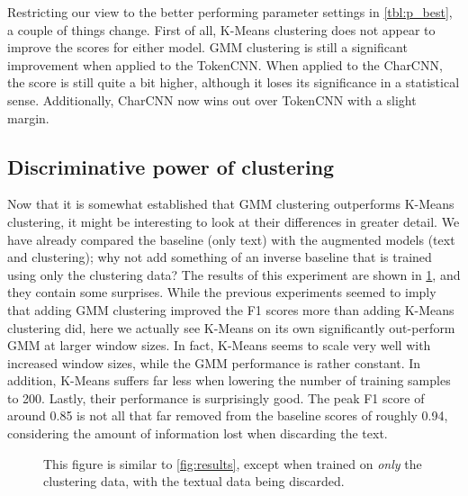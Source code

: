 Restricting our view to the better performing parameter settings in
\cref{tbl:p_best}, a couple of things change. First of all, K-Means clustering
does not appear to improve the scores for either model. GMM clustering is still
a significant improvement when applied to the TokenCNN. When applied to
the CharCNN, the score is still quite a bit higher, although it loses its
significance in a statistical sense. Additionally, CharCNN now wins out over
TokenCNN with a slight margin.

\subsection{Discriminative power of clustering}
Now that it is somewhat established that GMM clustering outperforms K-Means
clustering, it might be interesting to look at their differences in greater
detail. We have already compared the baseline (only text) with the augmented
models (text and clustering); why not add something of an inverse baseline that
is trained using only the clustering data? The results of this experiment are
shown in \cref{fig:only_clusters}, and they contain some surprises. While the
previous experiments seemed to imply that adding GMM clustering improved the F1
scores more than adding K-Means clustering did, here we actually see K-Means on
its own significantly out-perform GMM at larger window sizes. In fact, K-Means
seems to scale very well with increased window sizes, while the GMM performance
is rather constant. In addition, K-Means suffers far less when lowering the
number of training samples to 200. Lastly, their performance is surprisingly
good. The peak F1 score of around 0.85 is not all that far removed from the
baseline scores of roughly 0.94, considering the amount of information lost when
discarding the text.

\begin{figure}[tb]
  \centering
  \caption{This figure is similar to \cref{fig:results}, except when trained on
	\emph{only} the clustering data, with the textual data being
	discarded.\label{fig:only_clusters}}
\end{figure}


